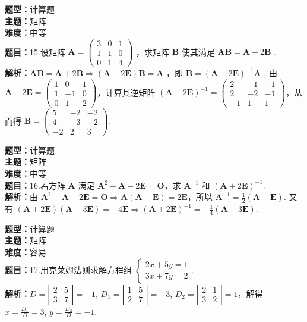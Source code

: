 \documentclass{ctexart}
\newenvironment{question}[5]{%
	\noindent\textbf{题型：}#1\\
	\textbf{主题：}#2\\
	\textbf{难度：}#3\\
	\textbf{题目：}#4\\
	\textbf{解析：}#5\\
	\vspace{1em}
}{}
\begin{document}
	
	\begin{question}
		{计算题}
		{矩阵}
		{中等}
		{15.设矩阵 \(\mathbf{A}=\left(\begin{array}{lll}3 & 0 & 1 \\ 1 & 1 & 0 \\ 0 & 1 & 4\end{array}\right)\) ，求矩阵 \(\mathbf{B}\) 使其满足 \(\mathbf{A B}=\mathbf{A}+2 \mathbf{B}\) . }
		{\(\mathbf{A B}=\mathbf{A}+2 \mathbf{B} \Rightarrow (\mathbf{A}-2\mathbf{E})\mathbf{B}=\mathbf{A}\) ，即 \(\mathbf{B}=(\mathbf{A}-2 \mathbf{E})^{-1} \mathbf{A}\) . 由 \(\mathbf{A}-2\mathbf{E}=\left(\begin{array}{ccc}1 & 0 & 1 \\ 1 & -1 & 0 \\ 0 & 1 & 2\end{array}\right)\)，计算其逆矩阵 \((\mathbf{A}-2 \mathbf{E})^{-1}=\left(\begin{array}{ccc}2 & -1 & -1 \\ 2 & -2 & -1 \\ -1 & 1 & 1\end{array}\right)\)，从而得 \(\mathbf{B}=\left(\begin{array}{ccc}5 & -2 & -2 \\ 4 & -3 & -2 \\ -2 & 2 & 3\end{array}\right)\). }
	\end{question}
	
	\begin{question}
		{计算题}
		{矩阵}
		{中等}
		{16.若方阵 \(\mathbf{A}\) 满足 \(\mathbf{A}^2-\mathbf{A}-2 \mathbf{E}=\mathbf{O}\)，求 \(\mathbf{A}^{-1}\) 和 \((\mathbf{A}+2 \mathbf{E})^{-1}\). }
		{由 \(\mathbf{A}^2-\mathbf{A}-2 \mathbf{E}=\mathbf{O} \Rightarrow \mathbf{A}(\mathbf{A}-\mathbf{E})=2 \mathbf{E}\)，所以 \(\mathbf{A}^{-1}=\frac{1}{2}(\mathbf{A}-\mathbf{E})\). 又有 \((\mathbf{A}+2 \mathbf{E})(\mathbf{A}-3 \mathbf{E})=-4 \mathbf{E} \Rightarrow (\mathbf{A}+2 \mathbf{E})^{-1}=-\frac{1}{4}(\mathbf{A}-3 \mathbf{E})\). }
	\end{question}
	
	\begin{question}
		{计算题}
		{矩阵}
		{容易}
		{17.用克莱姆法则求解方程组 \(\left\{\begin{array}{l}2x+5y=1 \\ 3x+7y=2\end{array}\right.\). }
		{\(D=\left|\begin{array}{cc}2 & 5 \\ 3 & 7\end{array}\right|=-1\), \(D_1=\left|\begin{array}{cc}1 & 5 \\ 2 & 7\end{array}\right|=-3\), \(D_2=\left|\begin{array}{cc}2 & 1 \\ 3 & 2\end{array}\right|=1\)，解得 \(x=\frac{D_1}{D}=3\), \(y=\frac{D_2}{D}=-1\). }
	\end{question}
	
\end{document}
